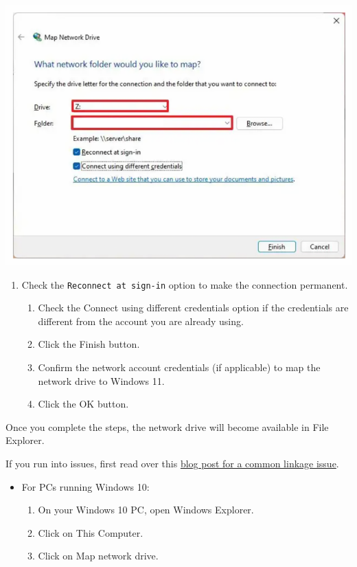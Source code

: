 \documentclass[
]{book}
\providecommand{\tightlist}{%
  \setlength{\itemsep}{0pt}\setlength{\parskip}{0pt}}
\begin{document}
\begin{flushleft}\includegraphics[width=0.75\linewidth]{images/nas_path} \end{flushleft}

\begin{enumerate}
\def\labelenumi{\arabic{enumi}.}
\setcounter{enumi}{5}
\tightlist
\item
  Check the \texttt{Reconnect\ at\ sign-in} option to make the connection permanent.

  \begin{enumerate}
  \def\labelenumii{\arabic{enumii}.}
  \setcounter{enumii}{6}
  \tightlist
  \item
    Check the Connect using different credentials option if the credentials are different from the account you are already using.
  \item
    Click the Finish button.
  \item
    Confirm the network account credentials (if applicable) to map the network drive to Windows 11.
  \item
    Click the OK button.
  \end{enumerate}
\end{enumerate}

Once you complete the steps, the network drive will become available in File Explorer.

If you run into issues, first read over this \href{https://www.robertwent.com/blog/mapping-a-synology-nas-drive-in-windows-11/}{blog post for a common linkage issue}.

\begin{itemize}
\tightlist
\item
  For PCs running Windows 10:

  \begin{enumerate}
  \def\labelenumi{\arabic{enumi}.}
  \tightlist
  \item
    On your Windows 10 PC, open Windows Explorer.
  \item
    Click on This Computer.
  \item
    Click on Map network drive.
  \end{enumerate}
\end{itemize}
\end{document}
